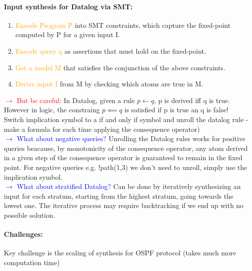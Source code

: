 \paragraph{Input synthesis for Datalog via SMT: }
\begin{enumerate}
    \item \textcolor{orange}{Encode Program P} into SMT constraints, which capture the fixed-point computed by P for a given input I.
    \item \textcolor{orange}{Encode query q} as assertions that must hold on the fixed-point.
    \item \textcolor{orange}{Get a model M} that satisfies the conjunction of the above constraints.
    \item \textcolor{orange}{Derive input I} from M by checking which atoms are true in M.
\end{enumerate}
\textcolor{red}{$\rightarrow$ But be careful: }In Datalog, given a rule $p \leftarrow q$, p is derived iff q is true. However in logic, the constraing $p \impliedby q$ is satisfied if p is true an q is false! Switch implication symbol to a if and only if symbol and unroll the datalog rule - make a formula for each time applying the consequence operator)\\
\textcolor{blue}{$\rightarrow$ What about negative queries?} Unrolling the Datalog rules works for positive queries beacause, by monotonicity of the consequence operator, any atom derived in a given step of the consequence operator is guaranteed to remain in the fixed point. For negative queries e.g. !path(1,3) we don't need to unroll, simply use the implication symbol.\\
\textcolor{blue}{$\rightarrow$ What about stratified Datalog?} Can be done by iteratively synthesizing an input for each stratum, starting from the highest stratum, going towards the lowest one. The iterative process may require backtracking if we end up with no possible solution.

\begin{minipage}{\linewidth}
    \centering      
    \def\svgwidth{\linewidth}
        
\end{minipage}

\paragraph{Challenges: }Key challenge is the scaling of synthesis for OSPF protocol (takes much more computation time)


